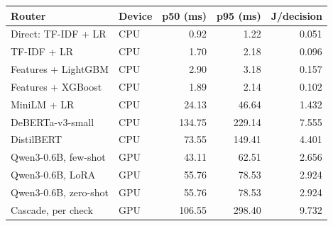 \setlength{\tabcolsep}{4pt}
\begin{tabular}{@{}llrrr@{}}
\toprule
Router & Device & p50 (ms) & p95 (ms) & J/decision \\
\midrule
Direct: TF-IDF + LR & CPU & 0.92 & 1.22 & 0.051 \\
TF-IDF + LR & CPU & 1.70 & 2.18 & 0.096 \\
Features + LightGBM & CPU & 2.90 & 3.18 & 0.157 \\
Features + XGBoost & CPU & 1.89 & 2.14 & 0.102 \\
MiniLM + LR & CPU & 24.13 & 46.64 & 1.432 \\
DeBERTa-v3-small & CPU & 134.75 & 229.14 & 7.555 \\
DistilBERT & CPU & 73.55 & 149.41 & 4.401 \\
Qwen3-0.6B, few-shot & GPU & 43.11 & 62.51 & 2.656 \\
Qwen3-0.6B, LoRA & GPU & 55.76 & 78.53 & 2.924 \\
Qwen3-0.6B, zero-shot & GPU & 55.76 & 78.53 & 2.924 \\
Cascade, per check & GPU & 106.55 & 298.40 & 9.732 \\
\bottomrule
\end{tabular}
